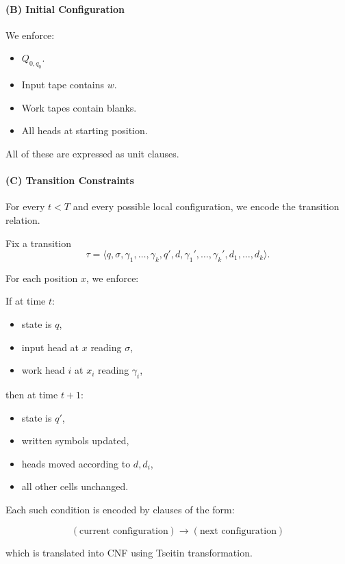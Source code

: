 \documentclass{article}
\begin{document}
\paragraph{(B) Initial Configuration}

We enforce:

\begin{itemize}
    \item $Q_{0,q_0}$.
    \item Input tape contains $w$.
    \item Work tapes contain blanks.
    \item All heads at starting position.
\end{itemize}

All of these are expressed as unit clauses.

\paragraph{(C) Transition Constraints}

For every $t<T$ and every possible local configuration,
we encode the transition relation.

Fix a transition
\[
\tau = \langle q, \sigma, \gamma_1,\dots,\gamma_k,
q', d, \gamma_1',\dots,\gamma_k', d_1,\dots,d_k \rangle.
\]

For each position $x$, we enforce:

If at time $t$:
\begin{itemize}
    \item state is $q$,
    \item input head at $x$ reading $\sigma$,
    \item work head $i$ at $x_i$ reading $\gamma_i$,
\end{itemize}

then at time $t+1$:
\begin{itemize}
    \item state is $q'$,
    \item written symbols updated,
    \item heads moved according to $d,d_i$,
    \item all other cells unchanged.
\end{itemize}

Each such condition is encoded by clauses of the form:

\[
(\text{current configuration})
\rightarrow
(\text{next configuration})
\]

which is translated into CNF using Tseitin transformation.
\end{document}
